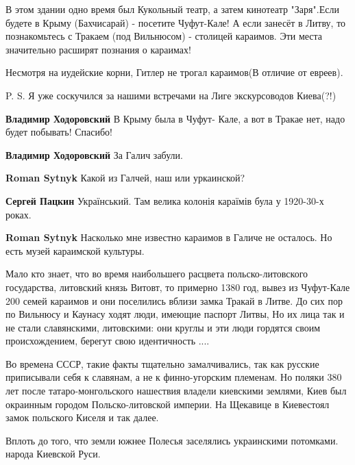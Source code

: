 \begin{itemize}

В этом здании одно время был Кукольный театр, а затем кинотеатр "Заря".Если
будете в Крыму (Бахчисарай) - посетите Чуфут-Кале! А если занесёт в Литву, то
познакомьтесь с Тракаем (под Вильнюсом) - столицей караимов. Эти места значительно
расширят познания о караимах!

Несмотря на иудейские корни, Гитлер не трогал караимов(В отличие от евреев).

P. S. Я уже соскучился за нашими встречами на Лиге экскурсоводов Киева(?!)

\begin{itemize} %
\textbf{Владимир Ходоровский} В Крыму была в Чуфут- Кале, а вот в Тракае нет, надо будет побывать! Спасибо!

\textbf{Владимир Ходоровский} За Галич забули.

\begin{itemize} %
\textbf{Roman Sytnyk} Какой из Галчей, наш или уркаинской?

\textbf{Сергей Пацкин} Український. Там велика колонія караїмів була у 1920-30-х роках.

\textbf{Roman Sytnyk} Насколько мне известно караимов в Галиче не осталось. Но есть музей караимской культуры.
\end{itemize} %

\end{itemize} %


Мало кто знает, что во время наибольшего расцвета польско-литовского
государства, литовский князь Витовт, то примерно 1380 год, вывез из Чуфут-Кале
200 семей караимов и они поселились вблизи замка Тракай в Литве. До сих пор по
Вильнюсу и Каунасу ходят люди, имеющие паспорт Литвы, Но их лица так и не стали
славянскими, литовскими: они круглы и эти люди гордятся своим происхождением,
берегут свою идентичность ....

Во времена СССР, такие факты тщательно замалчивались, так как русские
приписывали себя к славянам, а не к финно-угорским племенам. Но поляки 380 лет
после татаро-монгольского нашествия владели киевскими землями, Киев был
окраинным городом Польско-литовской империи. На Щекавице в Киевестоял замок
польского Киселя и так далее.

Вплоть до того, что земли южнее Полесья заселялись украинскими потомками.
народа Киевской Руси.


\end{itemize}
